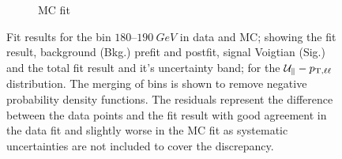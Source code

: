 \begin{figure}[htb]
\begin{subfigure}[b]{0.49\textwidth}
        \caption{MC fit}
        \label{subfigb:metres-fit-examples}
    \end{subfigure}
    \caption[Fit result to extract the recoil scale and resolution in data and simulation.]{
        Fit results for the \ptll bin $180$--$\SI{190}{GeV}$ in data and MC; showing the fit result, background (Bkg.) prefit and postfit, signal Voigtian (Sig.) and the total fit result and it's uncertainty band; for the $\mathcal{U}_{\parallel}-p_{\mathrm{T},\ell\ell}$ distribution. The merging of bins is shown to remove negative probability density functions. The residuals represent the difference between the data points and the fit result with good agreement in the data fit and slightly worse in the MC fit as systematic uncertainties are not included to cover the discrepancy.
    }
    \label{fig:metres-fit-examples}
\end{figure}

